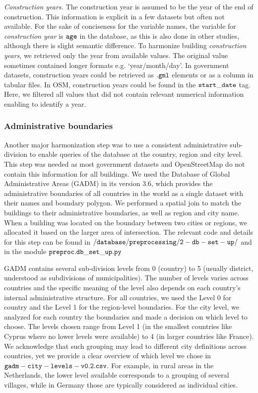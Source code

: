 \documentclass[fleqn,10pt]{wlscirep}
\begin{document}
\medskip \noindent \textit{Construction years.} \hspace{0.1cm} The construction year is assumed to be the year of the end of construction. This information is explicit in a few datasets but often not available. For the sake of conciseness for the variable names, the variable for \textit{construction year} is $\tt{age}$ in the database, as this is also done in other studies\cite{rosser2019predicting}, although there is slight semantic difference. To harmonize building \textit{construction years}, we retrieved only the year from available values. The original value sometimes contained longer formats e.g. `year/month/day'. In government datasets, construction years could be retrieved as $\tt{.gml}$ elements or as a column in tabular files. In OSM, construction years could be found in the $\tt{start\_date}$ tag. Here, we filtered all values that did not contain relevant numerical information enabling to identify a year.

\subsubsection*{Administrative boundaries}

Another major harmonization step was to use a consistent administrative sub-division to enable queries of the database at the country, region and city level. This step was needed as most government datasets and OpenStreetMap do not contain this information for all buildings. We used the Database of Global Administrative Areas (GADM) in its version 3.6, which provides the administrative boundaries of all countries in the world as a single dataset with their names and boundary polygon. We performed a spatial join to match the buildings to their administrative boundaries, as well as region and city name. When a building was located on the boundary between two cities or regions, we allocated it based on the larger area of intersection. The relevant code and details for this step can be found in $\tt{/database/preprocessing/2-db-set-up/}$ and in the module $\tt{preproc.db\_set\_up.py}$ \cite{eubucco-0.2-code2022}

GADM contains several sub-division levels from 0 (country) to 5 (usually district, understood as subdivisions of municipalities). The number of levels varies across countries and the specific meaning of the level also depends on each country's internal administrative structure. For all countries, we used the Level 0 for country and the Level 1 for the region-level boundaries. For the city level, we analyzed for each country the boundaries and made a decision on which level to choose. The levels chosen range from Level 1 (in the smallest countries like Cyprus where no lower levels were available) to 4 (in larger countries like France). We acknowledge that such grouping may lead to different city definitions across countries, yet we provide a clear overview of which level we chose in ${\tt gadm-city-levels-v0.2.csv}$. For example, in rural areas in the Netherlands, the lower level available corresponds to a grouping of several villages, while in Germany those are typically considered as individual cities. 
\end{document}
